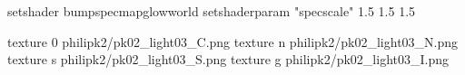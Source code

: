 setshader bumpspecmapglowworld
setshaderparam "specscale" 1.5 1.5 1.5


texture 0 philipk2/pk02_light03_C.png
texture n philipk2/pk02_light03_N.png
texture s philipk2/pk02_light03_S.png
texture g philipk2/pk02_light03_I.png

